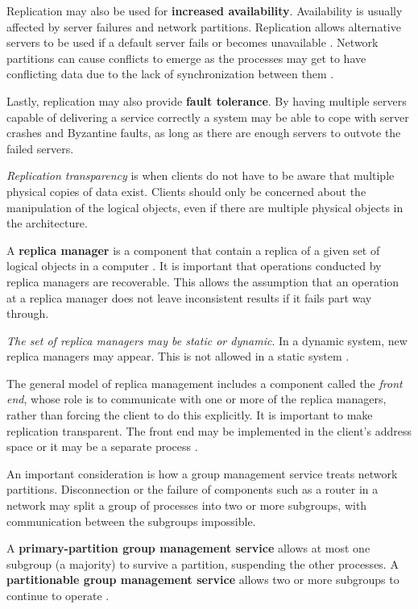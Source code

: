 \documentclass[12pt, oneside]{book}
\begin{document}
Replication may also be used for \textbf{increased availability}. Availability is usually affected by server failures and network partitions.
Replication allows alternative servers to be used if a default server fails or becomes unavailable \cite[p.~766]{distributed-systems-coulouris-2013}.
Network partitions can cause conflicts to emerge as the processes may get to have conflicting data due to the lack of synchronization between them \cite[p.~767]{distributed-systems-coulouris-2013}.

Lastly, replication may also provide \textbf{fault tolerance}. By having multiple servers capable of delivering a service correctly a system may be able to cope with server crashes and Byzantine faults, as long as there are enough servers to outvote the failed servers.

\textit{Replication transparency} is when clients do not have to be aware that multiple physical copies of data exist. Clients should only be concerned about the manipulation of the logical objects, even if there are multiple physical objects in the architecture.

A \textbf{replica manager} is a component that contain a replica of a given set of logical objects in a computer \cite[p.~769]{distributed-systems-coulouris-2013}.
It is important that operations conducted by replica managers are recoverable.
This allows the assumption that an operation at a replica manager does not leave inconsistent results if it fails part way through.

\textit{The set of replica managers may be static or dynamic}.
In a dynamic system, new replica managers may appear.
This is not allowed in a static system \cite[p.~769]{distributed-systems-coulouris-2013}.

The general model of replica management includes a component called the \textit{front end}, whose role is to communicate with one or more of the replica managers, rather than forcing the client to do this explicitly. It is important to make replication transparent. The front end may be implemented in the client's address space or it may be a separate process \cite[p.~770]{distributed-systems-coulouris-2013}.

An important consideration is how a group management service treats network
partitions. Disconnection or the failure of components such as a router in a network may
split a group of processes into two or more subgroups, with communication between the
subgroups impossible.

A \textbf{primary-partition group management service} allows at most one subgroup (a majority) to survive a partition, suspending the other processes. A \textbf{partitionable group management service} allows two or more subgroups to continue to operate \cite[p.~772]{distributed-systems-coulouris-2013}.
\end{document}
